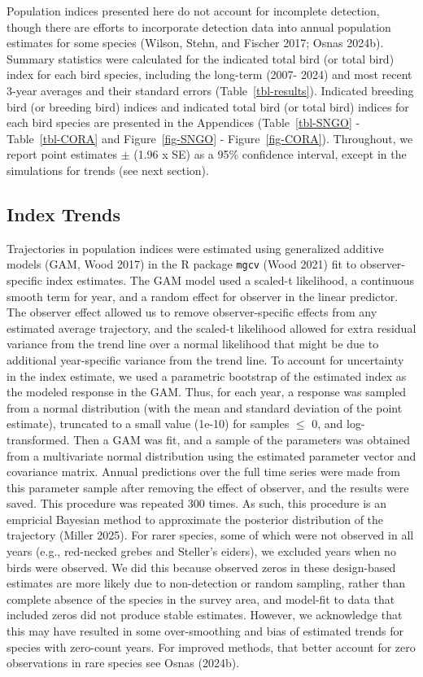 \documentclass[
]{article}
\begin{document}
Population indices presented here do not account for incomplete
detection, though there are efforts to incorporate detection data into
annual population estimates for some species (Wilson, Stehn, and Fischer
2017; Osnas 2024b). Summary statistics were calculated for the indicated
total bird (or total bird) index for each bird species, including the
long-term (2007- 2024) and most recent 3-year averages and their
standard errors (Table~\ref{tbl-results}). Indicated breeding bird (or
breeding bird) indices and indicated total bird (or total bird) indices
for each bird species are presented in the Appendices
(Table~\ref{tbl-SNGO} - Table~\ref{tbl-CORA} and Figure~\ref{fig-SNGO} -
Figure~\ref{fig-CORA}). Throughout, we report point estimates \(\pm\)
(1.96 x SE) as a 95\% confidence interval, except in the simulations for
trends (see next section).

\subsection*{Index Trends}\label{index-trends}

Trajectories in population indices were estimated using generalized
additive models (GAM, Wood 2017) in the R package \texttt{mgcv} (Wood
2021) fit to observer-specific index estimates. The GAM model used a
scaled-t likelihood, a continuous smooth term for year, and a random
effect for observer in the linear predictor. The observer effect allowed
us to remove observer-specific effects from any estimated average
trajectory, and the scaled-t likelihood allowed for extra residual
variance from the trend line over a normal likelihood that might be due
to additional year-specific variance from the trend line. To account for
uncertainty in the index estimate, we used a parametric bootstrap of the
estimated index as the modeled response in the GAM. Thus, for each year,
a response was sampled from a normal distribution (with the mean and
standard deviation of the point estimate), truncated to a small value
(1e-10) for samples \(\leq\) 0, and log-transformed. Then a GAM was fit,
and a sample of the parameters was obtained from a multivariate normal
distribution using the estimated parameter vector and covariance matrix.
Annual predictions over the full time series were made from this
parameter sample after removing the effect of observer, and the results
were saved. This procedure was repeated 300 times. As such, this
procedure is an empricial Bayesian method to approximate the posterior
distribution of the trajectory (Miller 2025). For rarer species, some of
which were not observed in all years (e.g., red-necked grebes and
Steller's eiders), we excluded years when no birds were observed. We did
this because observed zeros in these design-based estimates are more
likely due to non-detection or random sampling, rather than complete
absence of the species in the survey area, and model-fit to data that
included zeros did not produce stable estimates. However, we acknowledge
that this may have resulted in some over-smoothing and bias of estimated
trends for species with zero-count years. For improved methods, that
better account for zero observations in rare species see Osnas (2024b).
\end{document}
